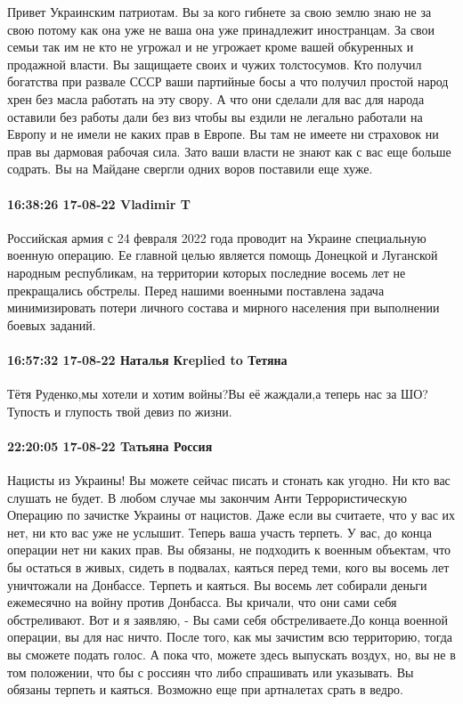 Привет Украинским патриотам. Вы за кого гибнете за свою землю знаю не за свою
потому как она уже не ваша она уже принадлежит иностранцам. За свои семьи так
им не кто не угрожал и не угрожает кроме вашей обкуренных и продажной власти.
Вы защищаете своих и чужих толстосумов. Кто получил богатства при развале СССР
ваши партийные босы а что получил простой народ хрен без масла работать на эту
свору. А что они сделали для вас для народа оставили без работы дали без виз
чтобы вы ездили не легально работали на Европу и не имели не каких прав в
Европе. Вы там не имеете ни страховок ни прав вы дармовая рабочая сила. Зато
ваши власти не знают как с вас еще больше содрать. Вы на Майдане свергли одних
воров поставили еще хуже.

\paragraph{16:38:26 17-08-22 Vladimir T}

Российская армия с 24 февраля 2022 года проводит на Украине специальную военную
операцию. Ее главной целью является помощь Донецкой и Луганской народным
республикам, на территории которых последние восемь лет не прекращались
обстрелы. Перед нашими военными поставлена задача минимизировать потери личного
состава и мирного населения при выполнении боевых заданий.

\paragraph{16:57:32 17-08-22 Наталья Кreplied to Тетяна}

Тётя Руденко,мы хотели и хотим войны?Вы её жаждали,а теперь нас за ШО?  Тупость
и глупость твой девиз по жизни.

\paragraph{22:20:05 17-08-22 Taтьяна Россия}

Нацисты из Украины! Вы можете сейчас писать и стонать как угодно. Ни кто вас
слушать не будет. В любом случае мы закончим Анти Террористическую Операцию по
зачистке Украины от нацистов. Даже если вы считаете, что у вас их нет, ни кто
вас уже не услышит. Теперь ваша участь терпеть. У вас, до конца операции нет ни
каких прав. Вы обязаны, не подходить к военным объектам, что бы остаться в
живых, сидеть в подвалах, каяться перед теми, кого вы восемь лет уничтожали на
Донбассе. Терпеть и каяться. Вы восемь лет собирали деньги ежемесячно на войну
против Донбасса. Вы кричали, что они сами себя обстреливают. Вот и я заявляю, -
Вы сами себя обстреливаете.До конца военной операции, вы для нас ничто. После
того, как мы зачистим всю территорию, тогда вы сможете подать голос. А пока
что, можете здесь выпускать воздух, но, вы не в том положении, что бы с россиян
что либо спрашивать или указывать. Вы обязаны терпеть и каяться. Возможно еще
при артналетах срать в ведро.


